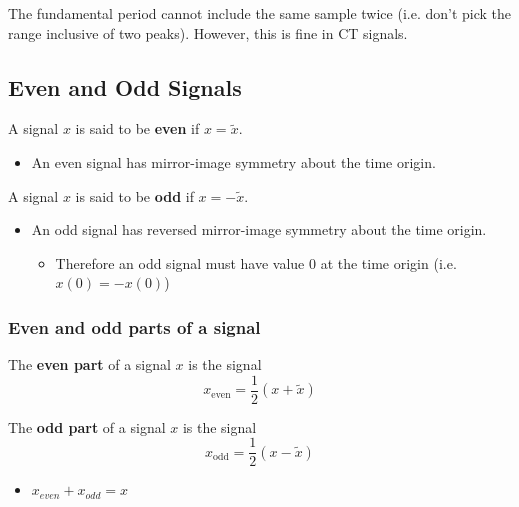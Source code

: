     \begin{example}
    \end{example}

    \begin{warning}
        The fundamental period cannot include the same sample twice (i.e. don't pick the range inclusive of two peaks). However, this is fine in CT signals.
    \end{warning}

\subsection{Even and Odd Signals}
\begin{definition} 

    A signal \(x\) is said to be \textbf{even} if \(x = \tilde{x}\).
    \begin{itemize}
        \item An even signal has mirror-image symmetry about the time origin.
    \end{itemize}
    \vspace{1em}

    A signal \(x\) is said to be \textbf{odd} if \(x = -\tilde{x}\).

    \begin{itemize}
        \item An odd signal has reversed mirror-image symmetry about the time origin.
        \begin{itemize}
            \item Therefore an odd signal must have value 0 at the time origin (i.e. $x(0) = -x(0)$)
        \end{itemize}
    \end{itemize}
\end{definition}

\begin{example}
\end{example}

    \subsubsection{Even and odd parts of a signal}
    \begin{definition}

        The \textbf{even part} of a signal \(x\) is the signal
        \begin{equation}
            x_{\text{even}} = \frac{1}{2}(x + \tilde{x})    
        \end{equation}

        The \textbf{odd part} of a signal \(x\) is the signal
        \begin{equation}
            x_{\text{odd}} = \frac{1}{2}(x - \tilde{x})
        \end{equation}

        \begin{itemize}
            \item $x_{even} + x_{odd} = x$
        \end{itemize}
    \end{definition}

